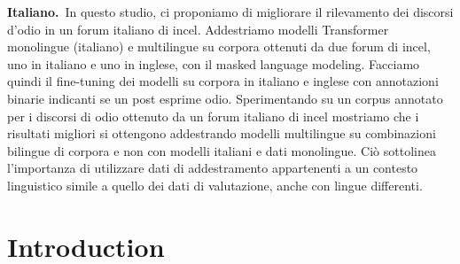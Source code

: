 \documentclass[11pt]{article}
\newcommand{\todoA}[1]{\todo[color=blue!40]{A: #1}}
\begin{document}
\begin{abstract-alt}
\textrm{\bf{Italiano.}}~In questo studio, ci proponiamo di migliorare il rilevamento dei discorsi d'odio in un forum italiano di incel.
Addestriamo modelli Transformer monolingue (italiano) e multilingue su corpora ottenuti da due forum di incel, uno in italiano e uno in inglese, con il masked language modeling. Facciamo quindi il fine-tuning dei modelli su corpora in italiano e inglese con annotazioni binarie indicanti se un post esprime odio.
Sperimentando su un corpus annotato per i discorsi di odio ottenuto da un forum italiano di incel mostriamo che i risultati migliori si ottengono addestrando modelli multilingue su combinazioni bilingue di corpora e non con modelli italiani e dati monolingue. Ciò sottolinea l'importanza di utilizzare dati di addestramento appartenenti a un contesto linguistico simile a quello dei dati di valutazione, anche con lingue differenti.

\end{abstract-alt}


\section{Introduction}
\end{document}
